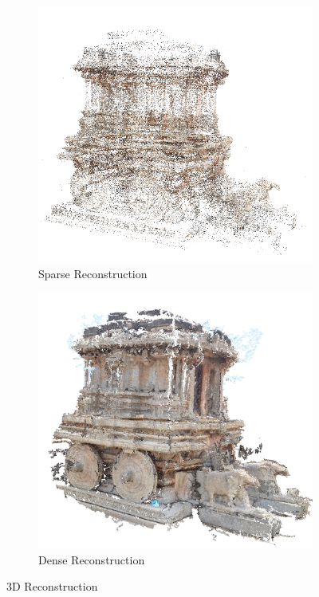 \documentclass{article}
\begin{document}
		\begin{figure}[ht!]
			\centering
			\begin{subfigure}{.5\textwidth}
			  	\centering
			  	\includegraphics[width=1.0\linewidth]{sparse_chariot.png}
			  	\caption{Sparse Reconstruction}
			  	\label{fig:sub1}
			\end{subfigure}%
			\begin{subfigure}{.5\textwidth}
			  	\centering
			  	\includegraphics[width=1.0\linewidth]{dense_chariot.png}
			  	\caption{Dense Reconstruction}
			  	\label{fig:sub2}
			\end{subfigure}
			\caption{3D Reconstruction}
			\label{figstart}
		\end{figure}
\end{document}
